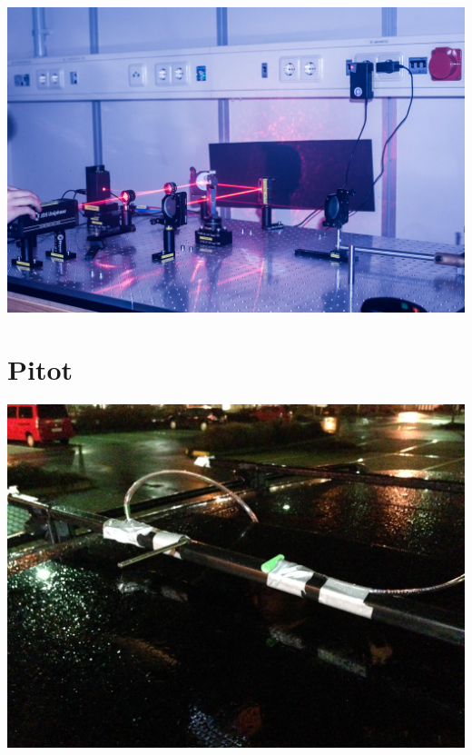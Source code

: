 \documentclass[11pt]{beamer}
\begin{document}
\begin{frame}
	\includegraphics[width=\textwidth]{images/2/interferrometer-6}
\end{frame}


\section{Pitot}
\begin{frame}
	\includegraphics[width=\textwidth]{images/3/IMG_0004}
\end{frame}
\end{document}
